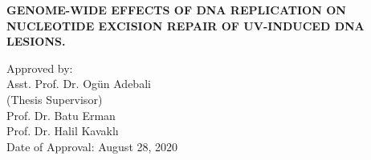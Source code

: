 \clearpage\pagebreak
\thispagestyle{empty} 
\onehalfspacing

\begin{tightcenter} 
\MakeUppercase{\textbf{GENOME-WIDE EFFECTS OF DNA REPLICATION ON
NUCLEOTIDE EXCISION REPAIR OF UV-INDUCED
DNA LESIONS.}}
\end{tightcenter}

\vspace{3\baselineskip}

Approved by:\\[3\baselineskip]
\setlength\parindent{1.25cm}
Asst. Prof. Dr. Ogün Adebali \dotfill \\
\indent (Thesis Supervisor) \\[2\baselineskip]
Prof. Dr. Batu Erman \dotfill \\[3\baselineskip]
Prof. Dr. Halil Kavaklı \dotfill \\[3\baselineskip]
\setlength\parindent{0cm}
Date of Approval: August 28, 2020

\clearpage\pagebreak
\thispagestyle{plain}